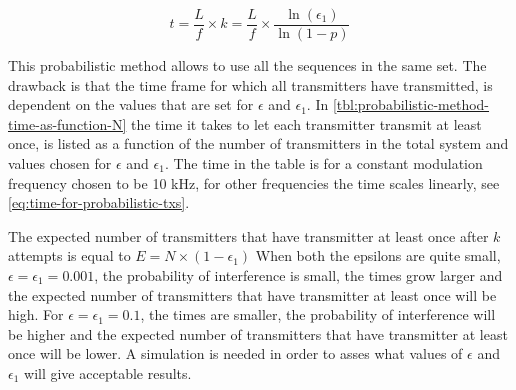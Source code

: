 \begin{equation}
	\label{eq:time-for-probabilistic-txs}
	t = \frac{L}{f} \times k = \frac{L}{f} \times \frac{\ln(\epsilon_1)}{\ln(1 - p)}
\end{equation}

This probabilistic method allows to use all the sequences in the same set.
The drawback is that the time frame for which all transmitters have transmitted, is dependent on the values that are set for $\epsilon$ and $\epsilon_1$.
In \autoref{tbl:probabilistic-method-time-as-function-N} the time it takes to let each transmitter transmit at least once, is listed as a function of the number of transmitters in the total system and values chosen for $\epsilon$ and $\epsilon_1$. 
The time in the table is for a constant modulation frequency chosen to be 10 kHz, for other frequencies the time scales linearly, see \autoref{eq:time-for-probabilistic-txs}.

The expected number of transmitters that have transmitter at least once after $k$ attempts is equal to $E = N \times (1 - \epsilon_1)$
When both the epsilons are quite small, $\epsilon = \epsilon_1 = 0.001$, the probability of interference is small, the times grow larger and the expected number of transmitters that have transmitter at least once will be high. 
For $\epsilon = \epsilon_1 = 0.1$, the times are smaller, the probability of interference will be higher and the expected number of transmitters that have transmitter at least once will be lower. 
A simulation is needed in order to asses what values of $\epsilon$ and $\epsilon_1$ will give acceptable results.



